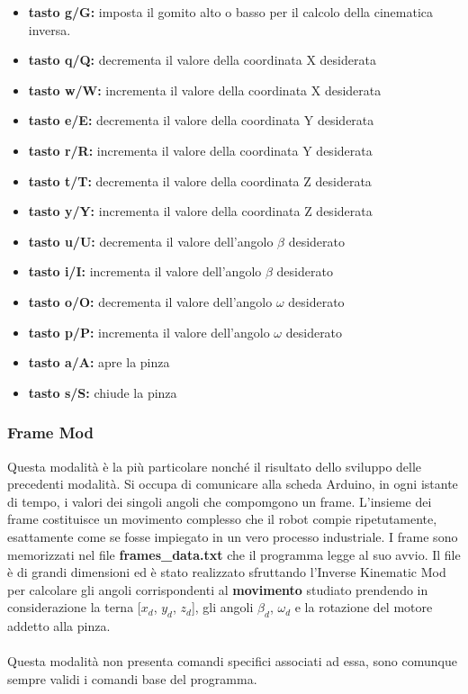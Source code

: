 \documentclass[a4paper]{article}
\begin{document}
    \begin{itemize}
      \item \textbf{tasto g/G:} imposta il gomito alto o basso per il calcolo della cinematica inversa.
      \item \textbf{tasto q/Q:} decrementa il valore della coordinata X desiderata
      \item \textbf{tasto w/W:} incrementa il valore della coordinata X desiderata
      \item \textbf{tasto e/E:} decrementa il valore della coordinata Y desiderata
      \item \textbf{tasto r/R:} incrementa il valore della coordinata Y desiderata
      \item \textbf{tasto t/T:} decrementa il valore della coordinata Z desiderata
      \item \textbf{tasto y/Y:} incrementa il valore della coordinata Z desiderata
      \item \textbf{tasto u/U:} decrementa il valore dell'angolo $\beta$ desiderato
      \item \textbf{tasto i/I:} incrementa il valore dell'angolo $\beta$ desiderato
      \item \textbf{tasto o/O:} decrementa il valore dell'angolo $\omega$ desiderato
      \item \textbf{tasto p/P:} incrementa il valore dell'angolo $\omega$ desiderato
      \item \textbf{tasto a/A:} apre la pinza
      \item \textbf{tasto s/S:} chiude la pinza
    \end{itemize}
    
    \subsubsection{Frame Mod}
    
    \begin{text}
        Questa modalità è la più particolare nonché il risultato dello sviluppo delle precedenti modalità. Si occupa di comunicare alla scheda Arduino, in ogni istante di tempo, i valori dei singoli angoli che compomgono un frame. L'insieme dei frame costituisce un movimento complesso che il robot compie ripetutamente, esattamente come se fosse impiegato in un vero processo industriale. I frame sono memorizzati nel file \textbf{frames\_data.txt} che il programma legge al suo avvio. Il file è di grandi dimensioni ed è stato realizzato sfruttando l'Inverse Kinematic Mod per calcolare gli angoli corrispondenti al \textbf{movimento} studiato prendendo in considerazione la terna [$x_d$, $y_d$, $z_d$], gli angoli $\beta_d$, $\omega_d$ e la rotazione del motore addetto alla pinza. \\ \\
        Questa modalità non presenta comandi specifici associati ad essa, sono comunque sempre validi i comandi base del programma.
    \end{text}
    
\end{document}
